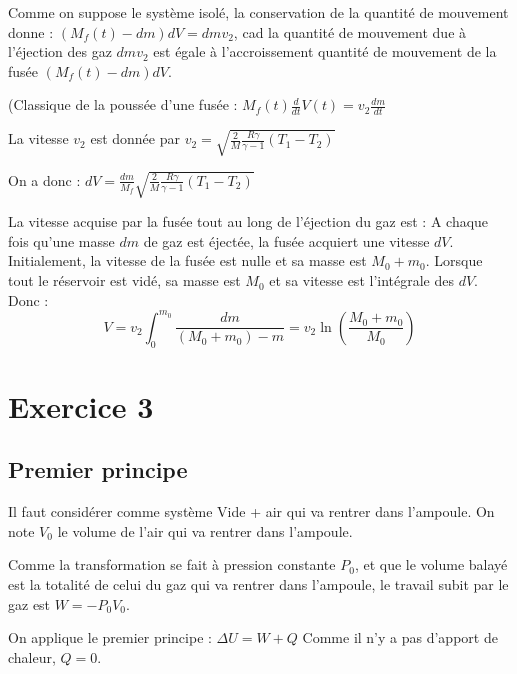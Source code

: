 \documentclass{report}
\begin{document}
Comme on suppose le système isolé, la conservation de la quantité de mouvement donne : $(M_f(t) - dm)dV = dmv_2$, cad la quantité de mouvement due à l'éjection des gaz $dmv_2$ est égale à l'accroissement quantité de mouvement de la fusée $(M_f(t) - dm)dV$.

\noindent{}

(Classique de la poussée d'une fusée : $M_f(t)\frac{d}{dt}V(t)=v_2\frac{dm}{dt}$

La vitesse $v_2$ est donnée par $v_2=\sqrt{\frac{2}{M}\frac{R\gamma}{\gamma-1}(T_1-T_2)}$

On a donc : $dV=\frac{dm}{M_f}\sqrt{\frac{2}{M}\frac{R\gamma}{\gamma-1}(T_1-T_2)}$


La vitesse acquise par la fusée tout au long de l'éjection du gaz est :
A chaque fois qu'une masse $dm$ de gaz est éjectée, la fusée acquiert une vitesse $dV$. Initialement, la vitesse de la fusée est nulle et sa masse est $M_0+m_0$. Lorsque tout le réservoir est vidé, sa masse est $M_0$ et sa vitesse est l'intégrale des $dV$. Donc :
\begin{equation}
	V=v_2\int_0^{m_0}\frac{dm}{(M_0+m_0)-m}=v_2\ln\left(\frac{M_0+m_0}{M_0} \right) 
\end{equation}

\noindent{}

\section*{Exercice 3}

\subsection*{Premier principe}

Il faut considérer comme système {Vide + air qui va rentrer dans l'ampoule}. On note $V_0$ le volume de l'air qui va rentrer dans l'ampoule.

Comme la transformation se fait à pression constante $P_0$, et que le volume balayé est la totalité de celui du gaz qui va rentrer dans l'ampoule, le travail subit par le gaz est $W = - P_0V_0$.

On applique le premier principe : $\Delta U = W + Q$
Comme il n'y a pas d'apport de chaleur, $Q=0$. 
\end{document}
